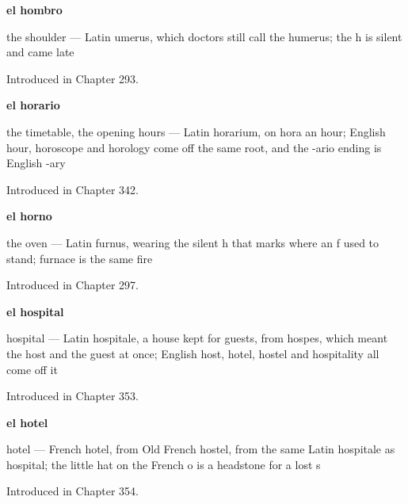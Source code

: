 \noindent\begin{minipage}[t]{\linewidth}
\raggedright
\textbf{el hombro}\par
\small the shoulder — Latin umerus, which doctors still call the humerus; the h is silent and came late\par
\footnotesize Introduced in Chapter 293.
\end{minipage}\par\medskip

\noindent\begin{minipage}[t]{\linewidth}
\raggedright
\textbf{el horario}\par
\small the timetable, the opening hours — Latin horarium, on hora an hour; English hour, horoscope and horology come off the same root, and the -ario ending is English -ary\par
\footnotesize Introduced in Chapter 342.
\end{minipage}\par\medskip

\noindent\begin{minipage}[t]{\linewidth}
\raggedright
\textbf{el horno}\par
\small the oven — Latin furnus, wearing the silent h that marks where an f used to stand; furnace is the same fire\par
\footnotesize Introduced in Chapter 297.
\end{minipage}\par\medskip

\noindent\begin{minipage}[t]{\linewidth}
\raggedright
\textbf{el hospital}\par
\small hospital — Latin hospitale, a house kept for guests, from hospes, which meant the host and the guest at once; English host, hotel, hostel and hospitality all come off it\par
\footnotesize Introduced in Chapter 353.
\end{minipage}\par\medskip

\noindent\begin{minipage}[t]{\linewidth}
\raggedright
\textbf{el hotel}\par
\small hotel — French hotel, from Old French hostel, from the same Latin hospitale as hospital; the little hat on the French o is a headstone for a lost s\par
\footnotesize Introduced in Chapter 354.
\end{minipage}\par\medskip

